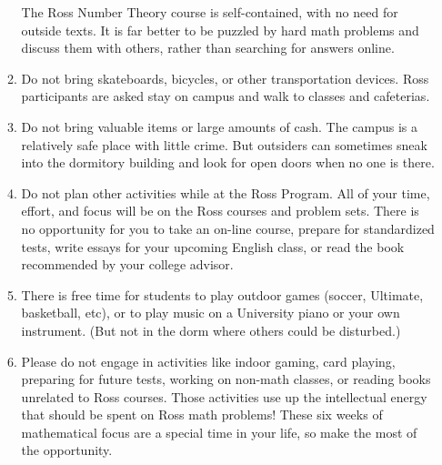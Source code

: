 \documentclass[11pt]{ross}
\begin{document}
\begin{enumerate}[label=(\arabic*),itemsep=2em,topsep=-1em]
\begin{enumerate}[label=(\alph*),itemsep=0.5em,topsep=0em]
    The Ross Number Theory course is self-contained, with no need for 
    outside texts.  It is far better to be puzzled by hard math problems 
    and discuss them with others, rather than searching for answers online.
  \item Do not bring skateboards, bicycles, or other transportation devices.
    Ross participants are asked stay on campus and walk to classes and cafeterias.
  \item Do not bring valuable items or large amounts of cash.  The
    campus is a relatively safe place with little crime.  But
    outsiders can sometimes sneak into the dormitory building and look
    for open doors when no one is there.
  \item Do not plan other activities while at the Ross Program. All of 
    your time, effort, and focus will be on the Ross courses and problem 
    sets.  There is no opportunity for you to take an on-line course, 
    prepare for standardized tests, write essays for your upcoming English 
    class, or read the book recommended by your college advisor.
  \item There is free time for students to play outdoor games (soccer, Ultimate, 
    basketball, etc), or to play music on a University piano or your own 
    instrument. (But not in the dorm where others could be disturbed.)
   \item Please do not engage in activities like indoor gaming, card
playing, preparing for future tests, working on non-math classes, or
reading books unrelated to Ross courses. Those activities use up the
intellectual energy that should be spent on Ross math problems!  These
six weeks of mathematical focus are a special time in your life, so
make the most of the opportunity.
\end{enumerate}
\end{enumerate}
\end{document}

